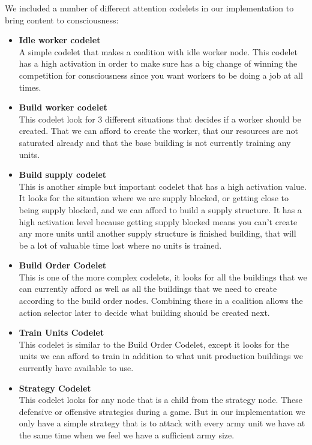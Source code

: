 We included a number of different attention codelets in our implementation to bring content to consciousness:
\begin{itemize}
\item \textbf{Idle worker codelet} \\
A simple codelet that makes a coalition with idle worker node. This codelet has a high activation in order to make sure has a big change of winning the competition for consciousness since you want workers to be doing a job at all times. 
\item \textbf{Build worker codelet} \\
This codelet look for 3 different situations that decides if a worker should be created. That we can afford to create the worker, that our resources are not saturated already and that the base building is not currently training any units. 
\item \textbf{Build supply codelet} \\
This is another simple but important codelet that has a high activation value. It looks for the situation where we are supply blocked, or getting close to being supply blocked, and we can afford to build a supply structure. It has a high activation level because getting supply blocked means you can't create any more units until another supply structure is finished building, that will be a lot of valuable time lost where no units is trained. 
\item \textbf{Build Order Codelet} \\
This is one of the more complex codelets, it looks for all the buildings that we can currently afford as well as all the buildings that we need to create according to the build order nodes. Combining these in a coalition allows the action selector later to decide what building should be created next. 
\item \textbf{Train Units Codelet} \\ 
This codelet is similar to the Build Order Codelet, except it looks for the units we can afford to train in addition to what unit production buildings we currently have available to use. 
\item \textbf{Strategy Codelet} \\
This codelet looks for any node that is a child from the strategy node. These defensive or offensive strategies during a game. But in our implementation we only have a simple strategy that is to attack with every army unit we have at the same time when we feel we have a sufficient army size.
\end{itemize}

